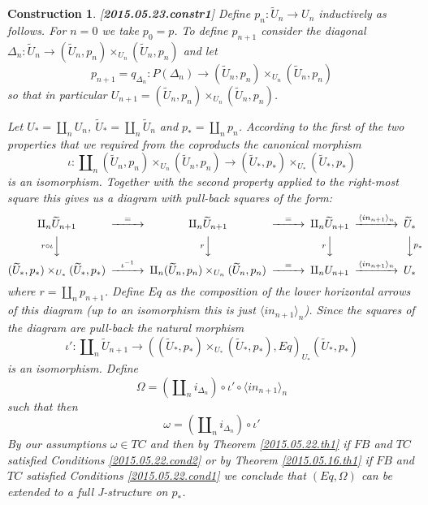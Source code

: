 \documentclass[12pt]{article}
\newtheorem{construction}[proposition]{Construction}
\newcommand{\llabel}[1]{\label{#1}[{\bf #1}]}
\newcommand{\sr}{\rightarrow}
\newcommand{\wt}{\widetilde}
\begin{document}
%
\begin{construction}\rm\llabel{2015.05.23.constr1}
Define $p_n:\wt{U}_n\sr U_n$ inductively as follows. For $n=0$ we take $p_0=p$. To define $p_{n+1}$ consider the diagonal $\Delta_n:\wt{U}_n\sr (\wt{U}_n,p_n)\times_{U_n}(\wt{U}_n,p_n)$ and let 
%
$$p_{n+1}=q_{\Delta_n}:P(\Delta_n)\sr (\wt{U}_n,p_n)\times_{U_n}(\wt{U}_n,p_n)$$
%
so that in particular $U_{n+1}=(\wt{U}_n,p_n)\times_{U_n}(\wt{U}_n,p_n)$. 

Let $U_*=\amalg_n U_n$, $\wt{U}_*=\amalg_n\wt{U}_n$ and $p_*=\amalg_n p_n$. According to the first of the two properties that we required from the coproducts the canonical morphism 
%
$$\iota:\amalg_n (\wt{U}_n,p_n)\times_{U_n}(\wt{U}_n,p_n)\sr (\wt{U}_*,p_*)\times_{U_*}(\wt{U}_*,p_*)$$
%
is an isomorphism. Together with the second property applied to the right-most square this gives us a diagram with pull-back squares of the form:
%
$$
\begin{CD}
\amalg_n\wt{U}_{n+1} @>=>> \amalg_n\wt{U}_{n+1} @>=>> \amalg_n\wt{U}_{n+1} @> \langle in_{n+1} \rangle_{n} >> \wt{U}_*\\
@V r\circ \iota VV @V r VV @V r VV @VV p_* V\\
(\wt{U}_*,p_*)\times_{U_*}(\wt{U}_*,p_*) @>\iota^{-1}>> \amalg_n (\wt{U}_n,p_n)\times_{U_n}(\wt{U}_n,p_n) @>=>> \amalg_n U_{n+1} @> \langle in_{n+1} \rangle_{n} >> U_*
\end{CD}
$$
%
where $r=\amalg_n p_{n+1}$. Define $Eq$ as the composition of the lower horizontal arrows of this diagram (up to an isomorphism this is just $\langle in_{n+1}\rangle_{n}$). Since the squares of the diagram are pull-back the natural morphism
%
$$\iota':\amalg_n\wt{U}_{n+1}\sr ((\wt{U}_*,p_*)\times_{U_*}(\wt{U}_*,p_*),Eq)_{U_*} (\wt{U}_*,p_*)$$
%
is an isomorphism. Define
%
$$\Omega=(\amalg_n i_{\Delta_n})\circ \iota'\circ \langle in_{n+1} \rangle_{n}$$
%
such that then 
%
$$\omega=(\amalg_n i_{\Delta_n})\circ \iota'$$
%
By our assumptions $\omega\in TC$ and then by Theorem \ref{2015.05.22.th1} if $FB$ and $TC$ satisfied Conditions \ref{2015.05.22.cond2} or by Theorem \ref{2015.05.16.th1} if $FB$ and $TC$ satisfied Conditions \ref{2015.05.22.cond1} we conclude that $(Eq,\Omega)$ can be extended to a full J-structure on $p_*$.
\end{construction}
%
\end{document}
